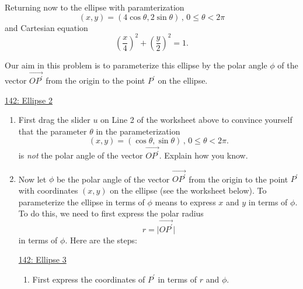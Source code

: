 \documentclass{ximera}
\begin{document}
\begin{example} \label{EX:9dfrebbvcxbfg}
Returning now to the ellipse with paramterization
\[
      (x,y) = (4\cos \theta , 2\sin\theta) \, , \, 0\leq \theta <2\pi
\]
and Cartesian equation
\[
     \left( \frac{x}{4} \right)^2 + \left( \frac{y}{2} \right)^2 = 1.
\]


Our aim in this problem is to parameterize this ellipse by the polar angle $\phi$ of the vector $\overrightarrow{OP^\prime}$ from the origin to the point $P^\prime$ on the ellipse.

\begin{onlineOnly}
    \begin{center}
\end{center}
\end{onlineOnly}

\href{https://www.desmos.com/calculator/nbdmgb1nbv}{142: Ellipse 2}


\begin{enumerate}
\item First drag the slider $u$ on Line 2 of the worksheet above to convince yourself that the parameter $\theta$ in the parameterization 
\[
    (x,y) = (\cos \theta , \sin\theta ) \, , \, 0 \leq \theta <2\pi .
\]
is \emph{not} the polar angle of the vector $\overrightarrow{OP^\prime}$. Explain how you know.

\begin{freeResponse}
\end{freeResponse}



\item Now let $\phi$ be the polar angle of the vector $\overrightarrow{OP^\prime}$ from the origin to the point $P^\prime$ with coordinates $(x,y)$ on the ellipse (see the worksheet below). To parameterize the ellipse in terms of $\phi$ means to express $x$ and $y$ in terms of $\phi$. To do this, we need to first express the polar radius  
\[
   r = \Big| \overrightarrow{OP^\prime}  \Big|
\]
in terms of $\phi$. Here are the steps:

\begin{onlineOnly}
    \begin{center}
\end{center}
\end{onlineOnly}

\href{https://www.desmos.com/calculator/rpzwhkhwlh}{142: Ellipse 3}


\begin{enumerate}
\item First express the coordinates of $P^\prime$ in terms of $r$ and $\phi$.


\end{enumerate}
\end{enumerate}
\end{example}
\end{document}
